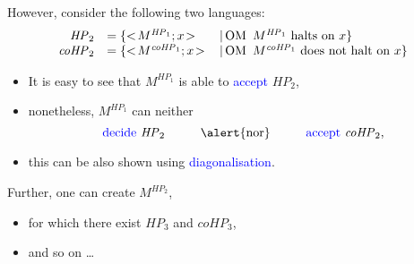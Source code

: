 \documentclass{beamer}
\newcommand{\HP}{\mathit{HP}}
\newcommand{\coHP}{\mathit{coHP}}
\newcommand{\st}{\,|\,}
\newcommand{\hlbl}[1]{\textcolor{blue}{#1}}
\begin{document}
\begin{frame}
  \frametitle{\insertsubsection}
  However, consider the following two languages:
  \begin{equation*}
  \begin{array}{rll}
      \HP_2 &= \{<\!M^{\HP_1};x\!>   & \st \mbox{OM\, $M^{\HP_1}$ halts on $x$}\} \\
    \coHP_2 &= \{<\!M^{\coHP_1};x\!> & \st \mbox{OM\, $M^{\coHP_1}$ does not halt on $x$}\}
  \end{array}
  \end{equation*}
  \pause
  \begin{itemize}
    \item  It is easy to see that $M^{\HP_1}$ is able to \hlbl{accept} $\HP_2$,
    \item  nonetheless, $M^{\HP_1}$ \alert{can neither}
      \begin{equation*}
        \mbox{\hlbl{decide}}~\HP_2\hspace{1cm}\mbox{\alert{nor}}\hspace{1cm}
        \mbox{\hlbl{accept}}~\coHP_2,
      \end{equation*}
    \item  this can be also shown using \hlbl{diagonalisation}.
  \end{itemize}
  \pause
  \vspace{2mm}
  Further, one can create $M^{\HP_2}$,
  \begin{itemize}
    \item  for which there exist $\HP_3$ and $\coHP_3$,
    \item  and so on \dots
  \end{itemize}
\end{frame}
\end{document}
